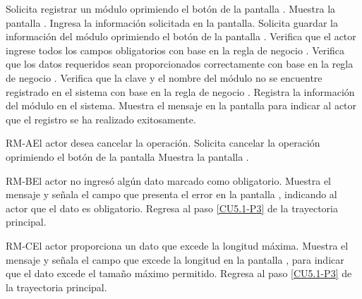 	\begin{UCtrayectoria}
		\UCpaso[\UCactor] Solicita registrar un módulo oprimiendo el botón  de la pantalla .
		\UCpaso[\UCsist] Muestra la pantalla .
		\UCpaso[\UCactor] Ingresa la información solicitada en la pantalla. \label{CU5.1-P3}
		\UCpaso[\UCactor] Solicita guardar la información del módulo oprimiendo el botón  de la pantalla . 
		\UCpaso[\UCsist] Verifica que el actor ingrese todos los campos obligatorios con base en la regla de negocio . 
		\UCpaso[\UCsist] Verifica que los datos requeridos sean proporcionados correctamente con base en la regla de negocio .  
		\UCpaso[\UCsist] Verifica que la clave y el nombre del módulo no se encuentre registrado en el sistema con base en la regla de negocio . 
		\UCpaso[\UCsist] Registra la información del módulo en el sistema.
		\UCpaso[\UCsist] Muestra el mensaje  en la pantalla  para indicar al actor que el registro se ha realizado exitosamente.
	\end{UCtrayectoria}		
	
	\begin{UCtrayectoriaA}{RM-A}{El actor desea cancelar la operación.}
		\UCpaso[\UCactor] Solicita cancelar la operación oprimiendo el botón  de la pantalla 
		\UCpaso[\UCsist] Muestra la pantalla .
	\end{UCtrayectoriaA}

	\begin{UCtrayectoriaA}{RM-B}{El actor no ingresó algún dato marcado como obligatorio.}
		\UCpaso[\UCsist] Muestra el mensaje  y señala el campo que presenta el error en la pantalla , indicando al actor que el dato es obligatorio.
		\UCpaso Regresa al paso \ref{CU5.1-P3} de la trayectoria principal.
	\end{UCtrayectoriaA}

	\begin{UCtrayectoriaA}{RM-C}{El actor proporciona un dato que excede la longitud máxima.}
		\UCpaso[\UCsist] Muestra el mensaje  y señala el campo que excede la longitud en la pantalla , para indicar que el dato excede el tamaño máximo permitido.
		\UCpaso Regresa al paso \ref{CU5.1-P3} de la trayectoria principal.
	\end{UCtrayectoriaA}
	
